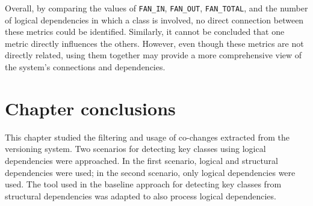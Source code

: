 \begin{table}[!h]
\renewcommand{\arraystretch}{1}
\caption{Top 10 measurements for Hibernate. }
\label{tab:measurementstop:hibernate}
\centering
{}
\end{table}

Overall, by comparing the values of \texttt{FAN\_IN}, \texttt{FAN\_OUT}, \texttt{FAN\_TOTAL}, and the number of logical dependencies in which a class is involved, no direct connection between these metrics could be identified. Similarly, it cannot be concluded that one metric directly influences the others. However, even though these metrics are not directly related, using them together may provide a more comprehensive view of the system’s connections and dependencies.

\section{Chapter conclusions}
\label{sec:key_class_conclusions}

\hspace{4em}This chapter studied the filtering and usage of co-changes extracted from the versioning system. Two scenarios for detecting key classes using logical dependencies were approached. In the first scenario, logical and structural dependencies were used; in the second scenario, only logical dependencies were used. The tool used in the baseline approach for detecting key classes from structural dependencies \cite{Finding-key-classes} was adapted to also process logical dependencies.

